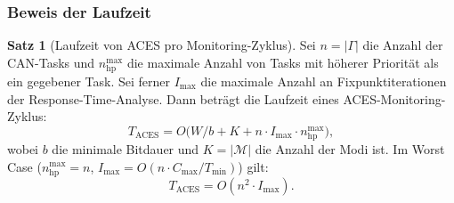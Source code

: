 ﻿\documentclass[a4paper,12pt]{article}
\theoremstyle{definition}
\newtheorem{satz}{Satz}
\begin{document}
\subsubsection{Beweis der Laufzeit}

\begin{satz}[Laufzeit von ACES pro Monitoring-Zyklus]
\label{satz:laufzeit}
Sei $n = |\Gamma|$ die Anzahl der CAN-Tasks und $n_{\mathrm{hp}}^{\max}$ die
maximale Anzahl von Tasks mit h\"{o}herer Priorit\"{a}t als ein gegebener Task.
Sei ferner $I_{\max}$ die maximale Anzahl an Fixpunktiterationen der
Response-Time-Analyse.
Dann betr\"{a}gt die Laufzeit eines ACES-Monitoring-Zyklus:
\[
    T_{\mathrm{ACES}} = O\bigl(W / b + K + n \cdot I_{\max} \cdot n_{\mathrm{hp}}^{\max}\bigr),
\]
wobei $b$ die minimale Bitdauer und $K = |\mathcal{M}|$ die Anzahl der Modi ist.
Im Worst Case ($n_{\mathrm{hp}}^{\max} = n$, $I_{\max} = O(n \cdot C_{\max} / T_{\min})$) gilt:
\[
    T_{\mathrm{ACES}} = O(n^2 \cdot I_{\max}).
\]
\end{satz}
\end{document}
